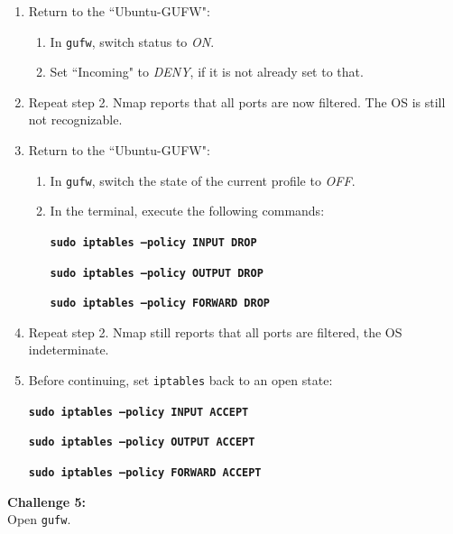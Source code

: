 \documentclass[12pt]{extarticle}
\newcommand{\ben}{\begin{enumerate}}
\newcommand{\een}{\end{enumerate}}
\begin{document}
\begin{enumerate}
\item Return to the ``Ubuntu-GUFW":
    \ben
        \item In \texttt{gufw}, switch status to \textit{ON}.
        \item Set ``Incoming" to \textit{DENY}, if it is not already set to that.
    \een

\item Repeat step 2. Nmap reports that all ports are now filtered. The OS is still not recognizable.

\item Return to the ``Ubuntu-GUFW":
    \ben
        \item In \texttt{gufw}, switch the state of the current profile to \textit{OFF}.
        \item In the terminal, execute the following commands:
        
        \texttt{\textbf{sudo iptables --policy INPUT DROP}}

        \texttt{\textbf{sudo iptables --policy OUTPUT DROP}}

        \texttt{\textbf{sudo iptables --policy FORWARD DROP}}
        
    \een
    
\item Repeat step 2. Nmap still reports that all ports are filtered, the OS indeterminate.

\item Before continuing, set \texttt{iptables} back to an open state:
        
\texttt{\textbf{sudo iptables --policy INPUT ACCEPT}}

\texttt{\textbf{sudo iptables --policy OUTPUT ACCEPT}}

\texttt{\textbf{sudo iptables --policy FORWARD ACCEPT}}
    
\end{enumerate}


\vspace{4mm}
\item \textbf{Challenge 5:}\\
\noindent 
Open \texttt{gufw}. 
\end{document}
